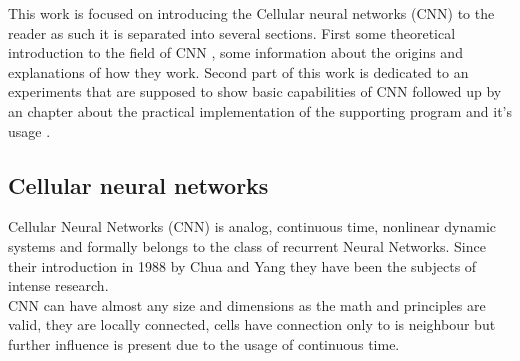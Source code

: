This work is focused on introducing the Cellular neural networks (CNN) to the reader as such it is separated into several sections. First some theoretical introduction to the field of CNN , some information about the origins and explanations of how they work. Second part of this work is dedicated to an experiments that are supposed to show basic capabilities of CNN followed up by an chapter about the practical implementation of the supporting program and it's usage \cite{Dolan-DeSouza}  . 


\subsection{Cellular neural networks}
Cellular Neural Networks (CNN) is analog, continuous time, nonlinear dynamic
systems and formally belongs to the class of recurrent Neural Networks. Since
their introduction in 1988 by Chua and Yang \cite{Chua-Yang} they have been the subjects of
intense research. \\
CNN can have almost any size and dimensions as the math and principles are valid, they are locally connected, cells have connection only to is neighbour but further influence is present due to the usage of continuous time. 